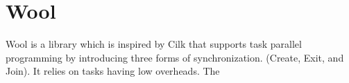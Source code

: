 \section{Wool}
Wool\cite{wool} is a library which is inspired by Cilk that supports task parallel programming by introducing three forms of synchronization. (Create, Exit, and Join). It relies on tasks having low overheads. The 

